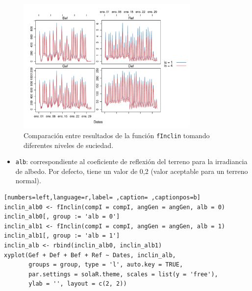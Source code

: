 \begin{itemize}
\begin{figure}[!htb]
\centering
\includegraphics[width=0.8\textwidth]{figuras/codigo-finclinis.pdf}
\caption{Comparación entre resultados de la función \texttt{fInclin} tomando diferentes niveles de suciedad.}
\end{figure}
\begin{itemize}
\item \texttt{alb}: correspondiente al coeficiente de reflexión del terreno para la irradiancia de albedo. Por defecto, tiene un valor de 0,2 (valor aceptable para un terreno normal).
\end{itemize}
\begin{lstlisting}[numbers=left,language=r,label= ,caption= ,captionpos=b]
inclin_alb0 <- fInclin(compI = compI, angGen = angGen, alb = 0)
inclin_alb0[, group := 'alb = 0']
inclin_alb1 <- fInclin(compI = compI, angGen = angGen, alb = 1)
inclin_alb1[, group := 'alb = 1']
inclin_alb <- rbind(inclin_alb0, inclin_alb1)
xyplot(Gef + Def + Bef + Ref ~ Dates, inclin_alb,
       groups = group, type = 'l', auto.key = TRUE,
       par.settings = solaR.theme, scales = list(y = 'free'),
       ylab = '', layout = c(2, 2))
\end{lstlisting}


\end{itemize}
